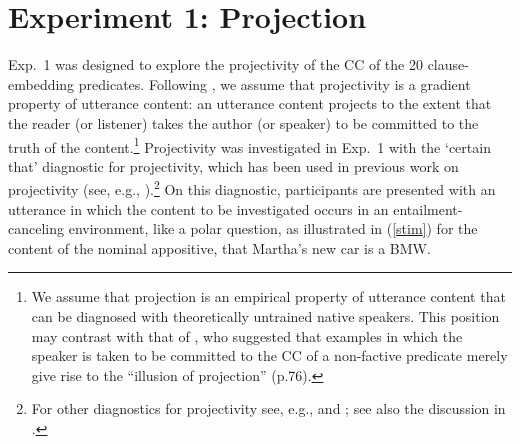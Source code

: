 \documentclass[11pt,fleqn]{article}
\newcommand{\6}{\mbox{$[\hspace*{-.6mm}[$}}
\newcommand{\9}{\mbox{$]\hspace*{-.6mm}]$}}
\begin{document}
%
%
%
%


\section{Experiment 1: Projection}\label{s2}

Exp.~1 was designed to explore the projectivity of the CC of the 20 clause-embedding predicates. Following \citealt{tbd-variability}, we assume that projectivity is a gradient property of utterance content: an utterance content projects to the extent that the reader (or listener) takes the author (or speaker) to be committed to the truth of the content.\footnote{We assume that projection is an empirical property of utterance content that can be diagnosed with theoretically untrained native speakers. This position may contrast with that of \citet{anand-hacquard2014}, who suggested that examples in which the speaker is taken to be committed to the CC of a non-factive predicate merely give rise to the ``illusion of projection'' (p.76).} Projectivity was investigated in Exp.~1 with the `certain that' diagnostic for projectivity, which has been used in previous work on projectivity (see, e.g., \citealt{tonhauser-salt26,djaerv-bacovcin-salt27,stevens-etal2017,tbd-variability,mahler-nels,demarneffe-etal-sub23}).\footnote{For other diagnostics for projectivity see, e.g., \citealt{smith-hall11,xue-onea11} and \citealt{brst-lang11}; see also the discussion in \citealt{tbd-variability}.} On this diagnostic, participants are presented with an utterance in which the content to be investigated occurs in an entailment-canceling environment, like a polar question, as illustrated in (\ref{stim}) for the content of the nominal appositive, that Martha's new car is a BMW. 
\end{document}
